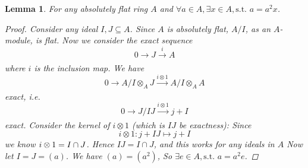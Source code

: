 \documentclass{article}
\theoremstyle{breakstyle}
\newtheorem{lemma}{Lemma}
\let\ker\relax
\DeclareMathOperator{\ker}{Ker}
\begin{document}
\begin{lemma}
    For any absolutely flat ring $A$ and $\forall a\in A,\exists x\in A,\text{s.t. }a=a^2x$.
\begin{proof}
    Consider any ideal $I,J\subseteq A$.
    Since $A$ is absolutely flat,
    $A / I$, as an $A$-module, is flat.
    Now we consider the exact sequence
    $$
    0\rightarrow J\xrightarrow[]{i} A
    $$
    where $i$ is the inclusion map.
    We have
    $$
    0\longrightarrow A / I\otimes _{A}J\xrightarrow[]{i\otimes 1} A / I\otimes _{A}A
    $$
    exact, i.e.
    $$
    0\longrightarrow J / IJ\xrightarrow[]{i\otimes 1} j+I
    $$
    exact.
    Consider the kernel of $i\otimes 1$ (which is $IJ$ be exactness):
    Since
    $$
    i\otimes 1:j+IJ\longmapsto j+I
    $$
    we know $\ker{i\otimes 1}=I\cap J$.
    Hence $IJ=I\cap J$, and this works for any ideals in $A$
    Now let $I=J=(a)$.
    We have $(a)=(a^2)$,
    So $\exists e\in A,\text{s.t. }a=a^2e$.
\end{proof}
\end{lemma}
\end{document}
